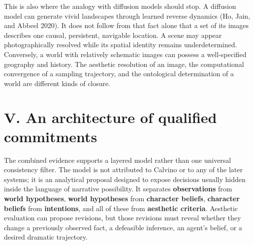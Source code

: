 \documentclass[
  11pt,
  letterpaper,
]{article}
\begin{document}
This is also where the analogy with diffusion models should stop. A
diffusion model can generate vivid landscapes through learned reverse
dynamics (Ho, Jain, and Abbeel 2020). It does not follow from that fact
alone that a set of its images describes one causal, persistent,
navigable location. A scene may appear photographically resolved while
its spatial identity remains underdetermined. Conversely, a world with
relatively schematic images can possess a well-specified geography and
history. The aesthetic resolution of an image, the computational
convergence of a sampling trajectory, and the ontological determination
of a world are different kinds of closure.

\section{V. An architecture of qualified
commitments}\label{v.-an-architecture-of-qualified-commitments}

The combined evidence supports a layered model rather than one universal
consistency filter. The model is not attributed to Calvino or to any of
the later systems; it is an analytical proposal designed to expose
decisions usually hidden inside the language of narrative possibility.
It separates \textbf{observations} from \textbf{world hypotheses},
\textbf{world hypotheses} from \textbf{character beliefs},
\textbf{character beliefs} from \textbf{intentions}, and all of these
from \textbf{aesthetic criteria}. Aesthetic evaluation can propose
revisions, but those revisions must reveal whether they change a
previously observed fact, a defeasible inference, an agent's belief, or
a desired dramatic trajectory.
\end{document}
